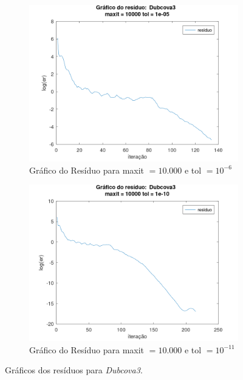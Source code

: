 \begin{figure}[H]
    \par\bigskip
    \begin{subfigure}[t]{0.4\linewidth}
         \centering
         \includegraphics[width=\textwidth]{image/Dubcova3_10000_-6.png}
         \caption{Gráfico do Resíduo para maxit $= 10.000$ e tol $=10^{-6}$}
         \label{fig:Dubcova3-10-6}
    \end{subfigure}
    \quad
    \begin{subfigure}[t]{0.4\linewidth}
         \centering
         \includegraphics[width=\textwidth]{image/Dubcova3_10000_-11.png}
         \caption{Gráfico do Resíduo para maxit $= 10.000$ e tol $=10^{-11}$}
         \label{fig:Dubcova3-10-11}
    \end{subfigure}
    \caption{Gráficos dos resíduos para \textit{Dubcova3}.}
    \label{fig:Dubcova3}
\end{figure}